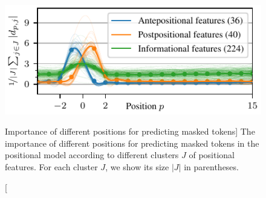 \begin{figure}
\centering
\includegraphics[width=0.7\columnwidth]{positional-features}
\vspace{-0.2cm}
\caption
  [Importance of different positions for predicting masked tokens]%
  {The importance of different positions for predicting masked tokens in
   the positional model according to different clusters $J$ of positional
   features. For each cluster $J$, we show its size $|J|$ in parentheses.
   \cite[Figure 4]{novotny2021when}}
\label{fig:position-independent-token-embeddings-interpretability}
\end{figure}
